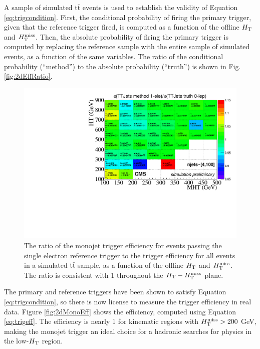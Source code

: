 A sample of simulated t$\bar{\text{t}}$ events is used to establish the validity of Equation \ref{eq:trigcondition}. First, the conditional probability of firing the primary trigger, given that the reference trigger fired, is computed as a function of the offline $H_{\rm T}$ and $H_{\text{T}}^{\rm miss}$. Then, the absolute probability of firing the primary trigger is computed by replacing the reference sample with the entire sample of simulated events, as a function of the same variables. The ratio of the conditional probability (``method'') to the absolute probability (``truth'') is shown in Fig. \ref{fig:2dEffRatio}. 
\begin{figure}[tb!]
  \begin{center}
    \includegraphics[width=0.95\linewidth]{figures/trigger/MonojetTrigger_EfficiencyRatioMC.pdf}
    \caption{
      The ratio of the monojet trigger efficiency for events passing the single
      electron reference trigger to the trigger efficiency for all
      events in a simulated t$\bar{\text{t}}$ sample, as a function of the offline $H_{\rm T}$
      and $H_{\text{T}}^{\rm miss}$. The ratio is consistent with 1 throughout the $H_{\rm T}-H_{\text{T}}^{\rm miss}$ plane.}
    \label{fig:2dMonoEffRatio}
  \end{center}
\end{figure}

The primary and reference triggers have been shown to satisfy Equation \ref{eq:trigcondition}, so there is now license to measure the trigger efficiency in real data.  Figure \ref{fig:2dMonoEff} shows the efficiency, computed using Equation \ref{eq:trigeff}. The efficiency is nearly 1 for kinematic regions with $H_{\text{T}}^{\rm miss}>200$ GeV, making the monojet trigger an ideal choice for a hadronic searches for physics in the low-$H_{\rm T}$ region.

